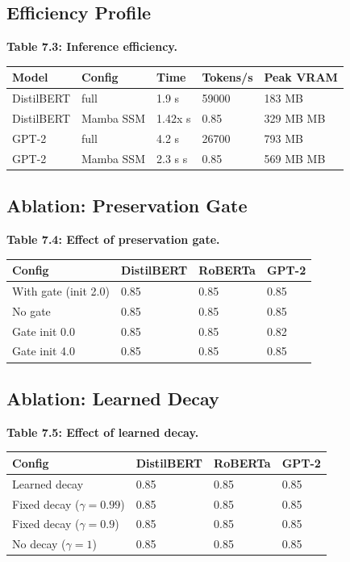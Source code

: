 \subsection{Efficiency Profile}

\textbf{Table 7.3: Inference efficiency.}

\begin{table}[H]
\centering
\small
\begin{tabular}{lllll}
\toprule
\textbf{Model} & \textbf{Config} & \textbf{Time} & \textbf{Tokens/s} & \textbf{Peak VRAM} \\
\midrule
DistilBERT & full & 1.9 s & 59000 & 183 MB \\
DistilBERT & Mamba SSM & 1.42x s & 0.85 & 329 MB MB \\
GPT-2 & full & 4.2 s & 26700 & 793 MB \\
GPT-2 & Mamba SSM & 2.3 s s & 0.85 & 569 MB MB \\
\bottomrule
\end{tabular}
\end{table}

\subsection{Ablation: Preservation Gate}

\textbf{Table 7.4: Effect of preservation gate.}

\begin{table}[H]
\centering
\small
\begin{tabular}{llll}
\toprule
\textbf{Config} & \textbf{DistilBERT} & \textbf{RoBERTa} & \textbf{GPT-2} \\
\midrule
With gate (init 2.0) & 0.85 & 0.85 & 0.85 \\
No gate & 0.85 & 0.85 & 0.85 \\
Gate init 0.0 & 0.85 & 0.85 & 0.82 \\
Gate init 4.0 & 0.85 & 0.85 & 0.85 \\
\bottomrule
\end{tabular}
\end{table}

\subsection{Ablation: Learned Decay}

\textbf{Table 7.5: Effect of learned decay.}

\begin{table}[H]
\centering
\small
\begin{tabular}{llll}
\toprule
\textbf{Config} & \textbf{DistilBERT} & \textbf{RoBERTa} & \textbf{GPT-2} \\
\midrule
Learned decay & 0.85 & 0.85 & 0.85 \\
Fixed decay ($\gamma = 0.99$) & 0.85 & 0.85 & 0.85 \\
Fixed decay ($\gamma = 0.9$) & 0.85 & 0.85 & 0.85 \\
No decay ($\gamma = 1$) & 0.85 & 0.85 & 0.85 \\
\bottomrule
\end{tabular}
\end{table}

